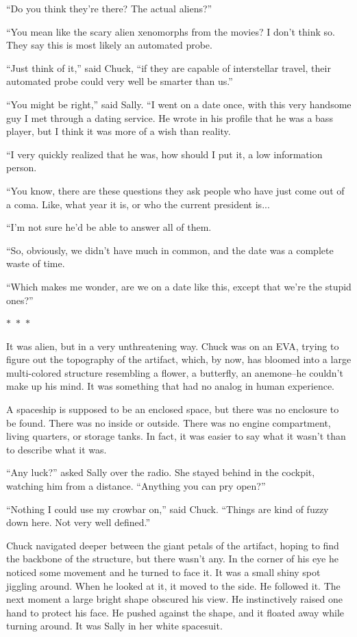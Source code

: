 \documentclass{memoir}
\newcommand{\starbreak}{%
\begin{center}
  $\ast$~$\ast$~$\ast$
\end{center}
}
\begin{document}
``Do you think they're there? The actual aliens?''

``You mean like the scary alien xenomorphs from the movies? I don't think so. They say this is most likely an automated probe.

``Just think of it,'' said Chuck, ``if they are capable of interstellar travel, their automated probe could very well be smarter than us.''

``You might be right,'' said Sally. ``I went on a date once, with this very handsome guy I met through a dating service. He wrote in his profile that he was a bass player, but I think it was more of a wish than reality. 

``I very quickly realized that he was, how should I put it, a low information person. 

``You know, there are these questions they ask people who have just come out of a coma. Like, what year it is, or who the current president is...

``I'm not sure he'd be able to answer all of them.

``So, obviously, we didn't have much in common, and the date was a complete waste of time.

``Which makes me wonder, are we on a date like this, except that we're the stupid ones?''

\starbreak

It was alien, but in a very unthreatening way. Chuck was on an EVA, trying to figure out the topography of the artifact, which, by now, has bloomed into a large multi-colored structure resembling a flower, a butterfly, an anemone--he couldn't make up his mind. It was something that had no analog in human experience.

A spaceship is supposed to be an enclosed space, but there was no enclosure to be found. There was no inside or outside. There was no engine compartment, living quarters, or storage tanks. In fact, it was easier to say what it wasn't than to describe what it was.

``Any luck?'' asked Sally over the radio. She stayed behind in the cockpit, watching him from a distance. ``Anything you can pry open?''

``Nothing I could use my crowbar on,'' said Chuck. ``Things are kind of fuzzy down here. Not very well defined.''

Chuck navigated deeper between the giant petals of the artifact, hoping to find the backbone of the structure, but there wasn't any. In the corner of his eye he noticed some movement and he turned to face it. It was a small shiny spot jiggling around. When he looked at it, it moved to the side. He followed it. The next moment a large bright shape obscured his view. He instinctively raised one hand to protect his face. He pushed against the shape, and it floated away while turning around. It was Sally in her white spacesuit.
\end{document}
